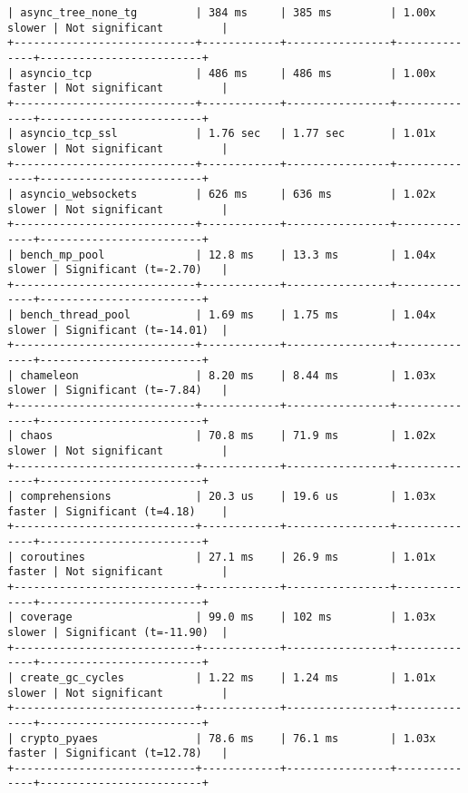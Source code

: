 \begin{code}
\begin{verbatim}
| async_tree_none_tg         | 384 ms     | 385 ms         | 1.00x slower | Not significant         |
+----------------------------+------------+----------------+--------------+-------------------------+
| asyncio_tcp                | 486 ms     | 486 ms         | 1.00x faster | Not significant         |
+----------------------------+------------+----------------+--------------+-------------------------+
| asyncio_tcp_ssl            | 1.76 sec   | 1.77 sec       | 1.01x slower | Not significant         |
+----------------------------+------------+----------------+--------------+-------------------------+
| asyncio_websockets         | 626 ms     | 636 ms         | 1.02x slower | Not significant         |
+----------------------------+------------+----------------+--------------+-------------------------+
| bench_mp_pool              | 12.8 ms    | 13.3 ms        | 1.04x slower | Significant (t=-2.70)   |
+----------------------------+------------+----------------+--------------+-------------------------+
| bench_thread_pool          | 1.69 ms    | 1.75 ms        | 1.04x slower | Significant (t=-14.01)  |
+----------------------------+------------+----------------+--------------+-------------------------+
| chameleon                  | 8.20 ms    | 8.44 ms        | 1.03x slower | Significant (t=-7.84)   |
+----------------------------+------------+----------------+--------------+-------------------------+
| chaos                      | 70.8 ms    | 71.9 ms        | 1.02x slower | Not significant         |
+----------------------------+------------+----------------+--------------+-------------------------+
| comprehensions             | 20.3 us    | 19.6 us        | 1.03x faster | Significant (t=4.18)    |
+----------------------------+------------+----------------+--------------+-------------------------+
| coroutines                 | 27.1 ms    | 26.9 ms        | 1.01x faster | Not significant         |
+----------------------------+------------+----------------+--------------+-------------------------+
| coverage                   | 99.0 ms    | 102 ms         | 1.03x slower | Significant (t=-11.90)  |
+----------------------------+------------+----------------+--------------+-------------------------+
| create_gc_cycles           | 1.22 ms    | 1.24 ms        | 1.01x slower | Not significant         |
+----------------------------+------------+----------------+--------------+-------------------------+
| crypto_pyaes               | 78.6 ms    | 76.1 ms        | 1.03x faster | Significant (t=12.78)   |
+----------------------------+------------+----------------+--------------+-------------------------+

\end{verbatim}
\end{code}
